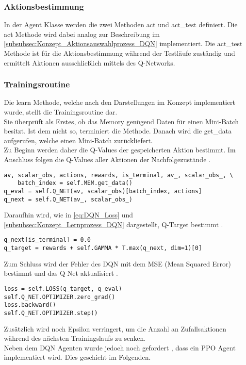 \subsubsection{Aktionsbestimmung} \label{subsubsec:Implementierung_Aktionsbestimmung_DQN}
In der Agent Klasse werden die zwei Methoden act und act\_test definiert. Die act Methode wird dabei analog zur Beschreibung im \autoref{subsubsec:Konzept_Aktionsauswahlprozess_DQN} implementiert.
Die act\_test Methode ist für die Aktionsbestimmung während der Testläufe zuständig und ermittelt Aktionen ausschließlich mittels des Q-Networks.

\subsubsection{Trainingsroutine} \label{subsubsec:Implementierung_Trainingsroutine_DQN}
Die learn Methode, welche nach den Darstellungen im Konzept implementiert wurde, stellt die Trainingsroutine dar. \\
Sie überprüft als Erstes, ob das Memory genügend Daten für einen Mini-Batch besitzt. Ist dem nicht so, terminiert die Methode.
Danach wird die get\_data aufgerufen, welche einen Mini-Batch zurückliefert.\\
Zu Beginn werden daher die Q-Values der gespeicherten Aktion bestimmt. Im Anschluss folgen die Q-Values aller Aktionen der Nachfolgezustände .
\newpage
\begin{lstlisting}[caption=Bestimmung der Q-Values, label=code:Bestimmung_Q-Values, style=Python]
av, scalar_obs, actions, rewards, is_terminal, av_, scalar_obs_, \
	batch_index = self.MEM.get_data()
q_eval = self.Q_NET(av, scalar_obs)[batch_index, actions]
q_next = self.Q_NET(av_, scalar_obs_)
\end{lstlisting}
Daraufhin wird, wie in \autoref{eq:DQN_Loss} und \autoref{subsubsec:Konzept_Lernprozess_DQN} dargestellt, Q-Target bestimmt .
\begin{lstlisting}[caption=Bestimmung von Q-Target, label=code:Bestimmung_Q-Target, style=Python]
q_next[is_terminal] = 0.0
q_target = rewards + self.GAMMA * T.max(q_next, dim=1)[0]
\end{lstlisting}
Zum Schluss wird der Fehler des DQN mit dem MSE (Mean Squared Error) bestimmt und das Q-Net aktualisiert .
\begin{lstlisting}[caption=Bestimmung des DQN Loss \& Update des Q-Networks, label=code:Bestimmung_DQN-Loss, style=Python]
loss = self.LOSS(q_target, q_eval)
self.Q_NET.OPTIMIZER.zero_grad()
loss.backward()
self.Q_NET.OPTIMIZER.step()
\end{lstlisting}
Zusätzlich wird noch Epsilon verringert, um die Anzahl an Zufallsaktionen während des nächsten Trainingslaufs zu senken.\\
Neben dem DQN Agenten wurde jedoch noch gefordert \fullref{subsec:Anforderungen_Diversität}, dass ein PPO Agent implementiert wird. Dies geschieht im Folgenden.

